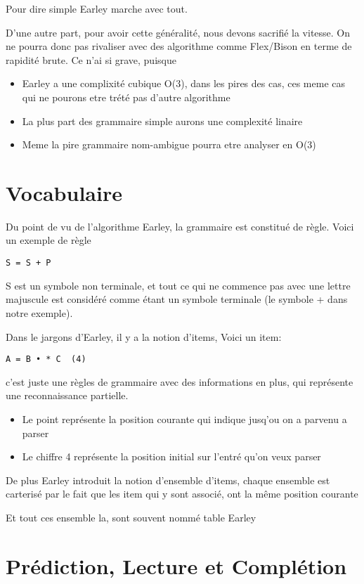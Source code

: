 \documentclass[10pt]{report}
\begin{document}
Pour dire simple Earley marche avec tout.

D'une autre part, pour avoir cette généralité, nous devons sacrifié la vitesse. On ne pourra donc pas rivaliser avec des algorithme comme Flex/Bison en terme de rapidité brute. Ce n'ai si grave, puisque
\begin{itemize}
	\item Earley a une complixité cubique O(3), dans les pires des cas, ces meme cas qui ne pourons etre trété pas d'autre algorithme
	\item La plus part des grammaire simple aurons une complexité linaire
	\item Meme la pire grammaire nom-ambigue pourra etre analyser en O(3)
\end{itemize}
\section{Vocabulaire}
Du point de vu de l'algorithme Earley, la grammaire est constitué de règle. Voici un exemple de règle
\begin{lstlisting}
S = S + P
\end{lstlisting}
S est un symbole non terminale, et tout ce qui ne commence pas avec une lettre majuscule est considéré comme étant un symbole terminale (le symbole + dans notre exemple).

Dans le jargons d'Earley, il y a la notion d'items, Voici un item:
\begin{lstlisting}
A = B • * C  (4)
\end{lstlisting}
c'est juste une règles de grammaire avec des informations en plus, qui représente une reconnaissance partielle.
\begin{itemize}
	\item Le point représente la position courante qui indique jusq'ou on a parvenu a parser
	\item Le chiffre 4 représente la position initial sur l'entré qu'on veux parser
\end{itemize}

De plus Earley introduit la notion d'ensemble d'items, chaque ensemble est carterisé par le fait que les item qui y sont associé, ont la même position courante

Et tout ces ensemble la, sont souvent nommé table Earley

\section{Prédiction, Lecture et Complétion}
\end{document}
